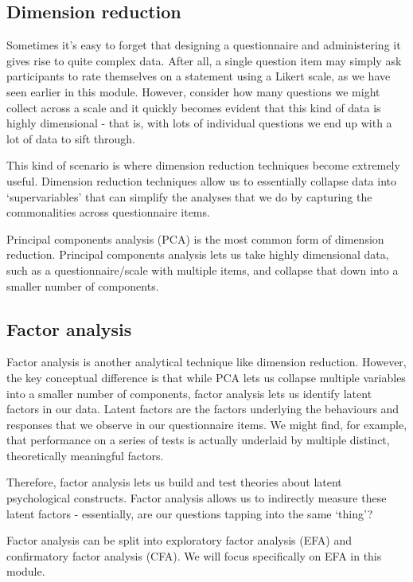 \documentclass[
]{book}
\begin{document}
\subsection{Dimension reduction}\label{dimension-reduction}

Sometimes it's easy to forget that designing a questionnaire and administering it gives rise to quite complex data. After all, a single question item may simply ask participants to rate themselves on a statement using a Likert scale, as we have seen earlier in this module. However, consider how many questions we might collect across a scale and it quickly becomes evident that this kind of data is highly dimensional - that is, with lots of individual questions we end up with a lot of data to sift through.

This kind of scenario is where dimension reduction techniques become extremely useful. Dimension reduction techniques allow us to essentially collapse data into `supervariables' that can simplify the analyses that we do by capturing the commonalities across questionnaire items.

Principal components analysis (PCA) is the most common form of dimension reduction. Principal components analysis lets us take highly dimensional data, such as a questionnaire/scale with multiple items, and collapse that down into a smaller number of components.

\subsection{Factor analysis}\label{factor-analysis}

Factor analysis is another analytical technique like dimension reduction. However, the key conceptual difference is that while PCA lets us collapse multiple variables into a smaller number of components, factor analysis lets us identify latent factors in our data. Latent factors are the factors underlying the behaviours and responses that we observe in our questionnaire items. We might find, for example, that performance on a series of tests is actually underlaid by multiple distinct, theoretically meaningful factors.

Therefore, factor analysis lets us build and test theories about latent psychological constructs. Factor analysis allows us to indirectly measure these latent factors - essentially, are our questions tapping into the same `thing'?

Factor analysis can be split into exploratory factor analysis (EFA) and confirmatory factor analysis (CFA). We will focus specifically on EFA in this module.
\end{document}
